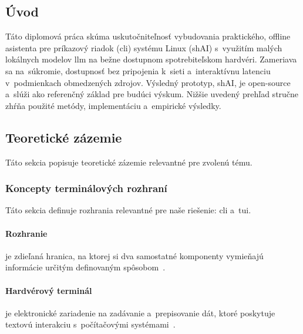 
\subsection*{Úvod}
Táto diplomová práca skúma uskutočniteľnosť vybudovania praktického, offline asistenta pre príkazový riadok (\gls{cli}) systému Linux (shAI) s~využitím malých lokálnych modelov \gls{llm} na bežne dostupnom spotrebiteľskom hardvéri. Zameriava sa na~súkromie, dostupnosť bez pripojenia k~sieti a~interaktívnu latenciu v~podmienkach obmedzených zdrojov.
Výsledný prototyp, shAI, je open-source a~slúži ako referenčný základ pre budúci výskum. Nižšie uvedený prehľad stručne zhŕňa použité metódy, implementáciu a~empirické výsledky.



\subsection*{Teoretické zázemie}

Táto sekcia popisuje teoretické zázemie relevantné pre zvolenú tému.

\subsubsection*{Koncepty terminálových rozhraní}

Táto sekcia definuje rozhrania relevantné pre naše riešenie: \gls{cli} a~\gls{tui}.

\paragraph{Rozhranie} je zdieľaná hranica, na ktorej si dva samostatné komponenty vymieňajú informácie určitým definovaným spôsobom~\cite{hookway2014}.

\paragraph{Hardvérový terminál} je elektronické zariadenie na zadávanie a~prepisovanie dát, ktoré poskytuje textovú interakciu s~počítačovými systémami~\cite{terminfo}.


